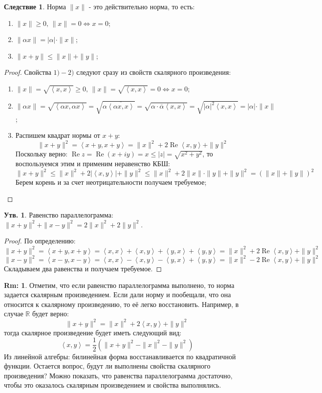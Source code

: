 \documentclass[12pt]{article}
\newcommand{\MR}{\mathbb{R}}
\theoremstyle{definition}
\newtheorem{rem}{Rm:}
\newtheorem{prop}{Утв.}
\newtheorem{corollary}{Следствие}
\newcommand{\inner}[2]{\left\langle #1, #2 \right\rangle }
\begin{document}
\begin{corollary}
	Норма $\|x\|$ - это действительно норма, то есть:
	\begin{enumerate}[label=\arabic*)]
		\item $\|x\| \geq 0, \, \|x\| = 0 \Leftrightarrow x = 0$;
		\item $\|\alpha x\| = |\alpha|{\cdot}\|x\|$;
		\item $\|x + y\| \leq \|x\| + \|y\|$;
	\end{enumerate} 
\end{corollary}
\begin{proof}Свойства $1)-2)$ следуют сразу из свойств скалярного произведения:
	\begin{enumerate}[label=\arabic*)]
		\item $\|x\| = \sqrt{\inner{x}{x}} \geq 0, \, \|x\| =  \sqrt{\inner{x}{x}} = 0 \Leftrightarrow x = 0$;
		\item $\|\alpha x\| = \sqrt{\inner{\alpha x}{\alpha x}} =\sqrt{\alpha\overline{\inner{\alpha x}{x}}} = \sqrt{\alpha{\cdot}\overline{\alpha}\inner{x}{x}} = \sqrt{|\alpha|^2  \inner{x}{x}} = |\alpha|{\cdot}\|x\|$;
		\item Распишем квадрат нормы от $x+y$:
		$$
			\|x + y\|^2  = \inner{x+y}{x+y} = \|x\|^2 + 2\operatorname{Re}\inner{x}{y} + \|y\|^2
		$$ 
		Поскольку верно: $\operatorname{Re}z = \operatorname{Re}(x + iy) = x \leq |z| = \sqrt{x^2 + y^2}$, то воспользуемся этим и применим неравенство КБШ:
		$$
			\|x + y\|^2 \leq \|x\|^2 + 2|\inner{x}{y}| +  \|y\|^2 \leq \|x\|^2 + 2\|x\|{\cdot}\|y\|+  \|y\|^2 = (\|x\| + \|y\|)^2
		$$
		Берем корень и за счет неотрицательности получаем требуемое;
	\end{enumerate} 
\end{proof}
\begin{prop}
	Равенство параллелограмма: $\|x + y\|^2 + \|x - y\|^2 = 2\|x\|^2 + 2\|y\|^2$.
\end{prop}
\begin{proof}
	По определению:
	$$
		\|x+y\|^2 =\inner{x+y}{x+y} = \inner{x}{x} + \inner{x}{y} + \inner{y}{x} + \inner{y}{y} = \|x\|^2 + 2\operatorname{Re}\inner{x}{y} + \|y\|^2
	$$
	$$
		\|x-y\|^2 =\inner{x-y}{x-y} = \inner{x}{x} - \inner{x}{y} - \inner{y}{x} + \inner{y}{y} = \|x\|^2 - 2\operatorname{Re}\inner{x}{y} + \|y\|^2
	$$
	Складываем два равенства и получаем требуемое.
\end{proof}
\begin{rem}
	Отметим, что если равенство параллелограмма выполнено, то норма задается скалярным произведением. Если дали норму и пообещали, что она относится к скалярному произведению, то её легко восстановить. Например, в случае $\MR$ будет верно: 
	$$
		\|x + y\|^2 = \|x\|^2 + 2\inner{x}{y} + \|y\|^2
	$$ 
	тогда скалярное произведение будет иметь следующий вид:
	$$
		\inner{x}{y} = \dfrac{1}{2}\left(\|x + y\|^2 - \|x\|^2 - \|y\|^2 \right)
	$$
	Из линейной алгебры: билинейная форма восстанавливается по квадратичной функции. Остается вопрос, будут ли выполнены свойства скалярного произведения? Можно показать, что равенства параллелограмма достаточно, чтобы это оказалось скалярным произведением и свойства выполнялись.
\end{rem}
\end{document}
